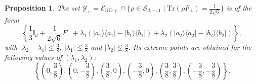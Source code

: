 \documentclass[a4paper, notitlepage, 11pt]{article}
\numberwithin{equation}{section}
\newcommand{\bra}[1]{\langle #1|}
\newcommand{\cket}[1]{|#1\rangle}
\newcommand{\EcalKDC}{{\mathcal E}_{\mathrm{KD+}}}
\newcommand{\bbone}{\mathbb{I}}
\newcommand{\SAOpone}{\mathcal{S}_{d,+,1}}
\newtheorem{Prop}[Theorem]{Proposition}
\begin{document}
\begin{Prop}\label{prop:Yplus}
The set $\mathcal Y_+=\EcalKDC \cap \{\rho\in \SAOpone \mid \mathrm{Tr}(\rho F_{\perp}) = \frac{1}{2\sqrt{6}}\}$ is of the form 
\[
\left\{\frac{1}{3}\bbone_{d} +\frac{1}{2\sqrt{6}}F_{\perp} + \lambda_1(\cket{a_1}\bra{a_1} - \cket{b_1}\bra{b_1}) + \lambda_2(\cket{a_2}\bra{a_2} - \cket{b_2}\bra{b_2}) \right\}, 
\]
with $\left|\lambda_2 - \lambda_1 \right| \leqslant \frac{3}{8}$, $\left|\lambda_1\right| \leqslant \frac{3}{8}$ and $\left|\lambda_2\right| \leqslant \frac{3}{8}$.
Its extreme points are obtained for the following  values of $(\lambda_1, \lambda_2)$:
\begin{equation}\label{eq:extremepoints}
 \left\{\left(0,\frac{3}{8}\right),\left(0,-\frac{3}{8}\right), \left(\frac{3}{8},0\right), \left(-\frac{3}{8},0\right), \left(\frac{3}{8},\frac{3}{8}\right), \left(-\frac{3}{8},-\frac{3}{8}\right)\right\}.
\end{equation}
\end{Prop}
\end{document}
